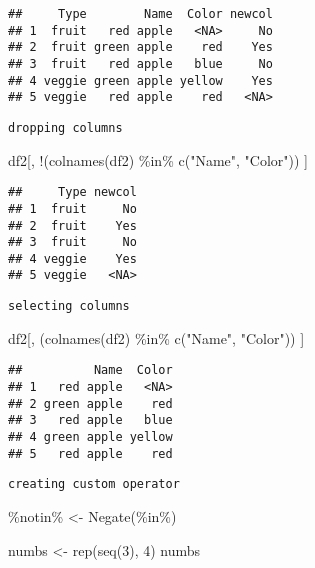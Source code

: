 \documentclass[
]{book}
\newenvironment{Shaded}{\begin{snugshade}}{\end{snugshade}}
\newcommand{\AttributeTok}[1]{\textcolor[rgb]{0.77,0.63,0.00}{#1}}
\newcommand{\DecValTok}[1]{\textcolor[rgb]{0.00,0.00,0.81}{#1}}
\newcommand{\FunctionTok}[1]{\textcolor[rgb]{0.00,0.00,0.00}{#1}}
\newcommand{\NormalTok}[1]{#1}
\newcommand{\OtherTok}[1]{\textcolor[rgb]{0.56,0.35,0.01}{#1}}
\newcommand{\SpecialCharTok}[1]{\textcolor[rgb]{0.00,0.00,0.00}{#1}}
\newcommand{\StringTok}[1]{\textcolor[rgb]{0.31,0.60,0.02}{#1}}
\begin{document}
\begin{verbatim}
##     Type        Name  Color newcol
## 1  fruit   red apple   <NA>     No
## 2  fruit green apple    red    Yes
## 3  fruit   red apple   blue     No
## 4 veggie green apple yellow    Yes
## 5 veggie   red apple    red   <NA>
\end{verbatim}

\texttt{dropping\ columns}

\begin{Shaded}
\begin{Highlighting}[]
\NormalTok{df2[, }\SpecialCharTok{!}\NormalTok{(}\FunctionTok{colnames}\NormalTok{(df2) }\SpecialCharTok{\%in\%} \FunctionTok{c}\NormalTok{(}\StringTok{"Name"}\NormalTok{, }\StringTok{"Color"}\NormalTok{)) ]}
\end{Highlighting}
\end{Shaded}

\begin{verbatim}
##     Type newcol
## 1  fruit     No
## 2  fruit    Yes
## 3  fruit     No
## 4 veggie    Yes
## 5 veggie   <NA>
\end{verbatim}

\texttt{selecting\ columns}

\begin{Shaded}
\begin{Highlighting}[]
\NormalTok{df2[, (}\FunctionTok{colnames}\NormalTok{(df2) }\SpecialCharTok{\%in\%} \FunctionTok{c}\NormalTok{(}\StringTok{"Name"}\NormalTok{, }\StringTok{"Color"}\NormalTok{)) ]}
\end{Highlighting}
\end{Shaded}

\begin{verbatim}
##          Name  Color
## 1   red apple   <NA>
## 2 green apple    red
## 3   red apple   blue
## 4 green apple yellow
## 5   red apple    red
\end{verbatim}

\texttt{creating\ custom\ operator}

\begin{Shaded}
\begin{Highlighting}[]
\StringTok{\textasciigrave{}}\AttributeTok{\%notin\%}\StringTok{\textasciigrave{}} \OtherTok{\textless{}{-}} \FunctionTok{Negate}\NormalTok{(}\StringTok{\textasciigrave{}}\AttributeTok{\%in\%}\StringTok{\textasciigrave{}}\NormalTok{)}

\NormalTok{numbs }\OtherTok{\textless{}{-}} \FunctionTok{rep}\NormalTok{(}\FunctionTok{seq}\NormalTok{(}\DecValTok{3}\NormalTok{), }\DecValTok{4}\NormalTok{)}
\NormalTok{numbs}
\end{Highlighting}
\end{Shaded}
\end{document}
